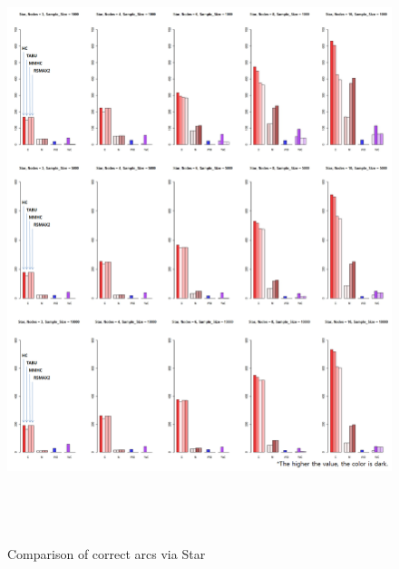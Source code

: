 	\begin{figure}[p]
	\centering
		\includegraphics[height=500pt]{03_Star_Arcs}
		\caption{Comparison of correct arcs via Star}
	\end{figure}	
